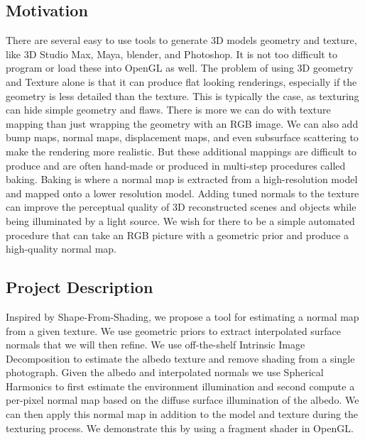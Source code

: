 \documentclass[10pt,twocolumn,letterpaper]{article}
\begin{document}
\subsection{Motivation}
 There are several easy to use tools to generate 3D models geometry and texture, like 3D Studio Max, Maya, blender, and Photoshop. It is not too difficult to program or load these into OpenGL as well. The problem of using 3D geometry and Texture alone is that it can produce flat looking renderings, especially if the geometry is less detailed than the texture. This is typically the case, as texturing can hide simple geometry and flaws. There is more we can do with texture mapping than just wrapping the geometry with an RGB image. We can also add bump maps, normal maps, displacement maps, and even subsurface scattering to make the rendering more realistic. But these additional mappings are difficult to produce and are often hand-made or produced in multi-step procedures called baking. Baking is where a normal map is extracted from a high-resolution model and mapped onto a lower resolution model. Adding tuned normals to the texture can improve the perceptual quality of 3D reconstructed scenes and objects while being illuminated by a light source. We wish for there to be a simple automated procedure that can take an RGB picture with a geometric prior and produce a high-quality normal map.


\subsection{Project Description}
Inspired by Shape-From-Shading, we propose a tool for estimating a normal map from a given texture. We use geometric priors to extract interpolated surface normals that we will then refine. We use off-the-shelf Intrinsic Image Decomposition to estimate the albedo texture and remove shading from a single photograph. Given the albedo and interpolated normals we use Spherical Harmonics to first estimate the environment illumination and second compute a per-pixel normal map based on the diffuse surface illumination of the albedo. We can then apply this normal map in addition to the model and texture during the texturing process. We demonstrate this by using a fragment shader in OpenGL.
\end{document}
